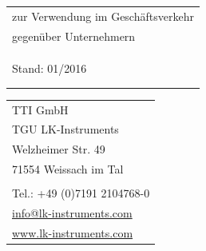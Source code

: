 \documentclass[a4paper, final, 11pt, oneside]{scrartcl}
\begin{document}
\thispagestyle{fancy}

  \begin{minipage}[l]{0.6\textwidth}
    \hspace*{-3.5mm}
    \footnotesize
    \begin{tabular}[t]{l@{}}
      zur Verwendung im Geschäftsverkehr\\
      gegenüber Unternehmern\\
      \\
      \\
      \\
      Stand: 01/2016\\
      \\
      \\
    \end{tabular}
    \footnotesize    
  \end{minipage}
  \hfill
  \begin{minipage}[c]{0.3\textwidth}
    \begin{flushright}
      \footnotesize
      \begin{tabular}[t]{l@{}}
      TTI GmbH\\
      TGU LK-Instruments\\
      Welzheimer Str. 49\\
      71554 Weissach im Tal\\
      \\
      Tel.: +49 (0)7191 2104768-0\\
      \href{mailto:info@lk-instruments.com}{info@lk-instruments.com}\\
      \href{http://www.lk-instruments.com}{www.lk-instruments.com}\\
    \end{tabular}
    \end{flushright}
  \end{minipage}
  
\end{document}
